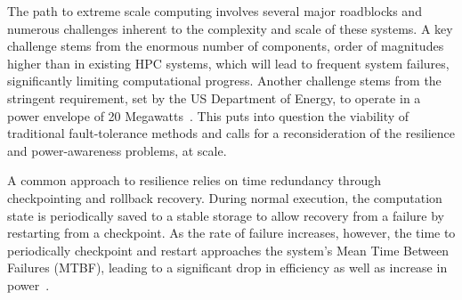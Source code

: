 
The path to extreme scale computing involves several major roadblocks and numerous challenges inherent to the complexity and scale of these systems. A key challenge stems from the enormous number of components, order of magnitudes higher than in existing HPC systems, which will lead to frequent system failures, significantly limiting computational progress. Another challenge stems from the stringent requirement, set by the US Department of Energy, to operate in a power envelope of 20 Megawatts~\cite{Bergman08exascalecomputing}. This puts into question the viability of traditional fault-tolerance methods and calls for a reconsideration of the resilience and power-awareness problems, at scale.

A common approach to resilience relies on time redundancy through checkpointing and rollback recovery. During normal execution, the computation state is periodically saved to a stable storage to allow recovery from a failure by restarting from a checkpoint. As the rate of failure increases, however, the time to periodically checkpoint and restart approaches the system's Mean Time Between Failures (MTBF), leading to a significant drop in efficiency as well as increase in power~\cite{4367962,1350776}. %

